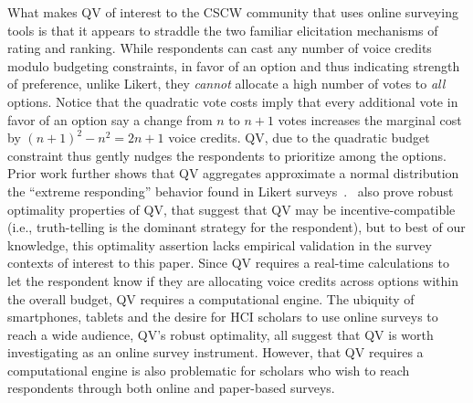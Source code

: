 
What makes QV of interest to the CSCW community that uses online surveying tools is that it appears to straddle the two familiar elicitation mechanisms of rating and ranking. While respondents can cast any number of voice credits modulo budgeting constraints, in favor of an option and thus indicating strength of preference, unlike Likert, they \textit{cannot} allocate a high number of votes to \textit{all} options. Notice that the quadratic vote costs imply that every additional vote in favor of an option say a change from $n$ to $n+1$ votes increases the marginal cost by $(n+1)^2-n^2=2n+1$ voice credits. QV, due to the quadratic budget constraint thus gently nudges the respondents to prioritize among the options. Prior work further shows that QV aggregates approximate a normal distribution   the ``extreme responding'' behavior found in Likert surveys~\cite{quarfoot2017quadratic}.~\textcite{Lalley2018} also prove robust optimality properties of QV, that suggest that QV may be incentive-compatible (i.e., truth-telling is the dominant strategy for the respondent), but to best of our knowledge, this optimality assertion lacks empirical validation in the survey contexts of interest to this paper. Since QV requires a real-time calculations to let the respondent know if they are allocating voice credits across options within the overall budget, QV requires a computational engine. The ubiquity of smartphones, tablets and the desire for HCI scholars to use online surveys to reach a wide audience, QV's robust optimality, all suggest that QV is worth investigating as an online survey instrument. However, that QV requires a computational engine is also problematic for scholars who wish to reach respondents through both online and paper-based surveys.









